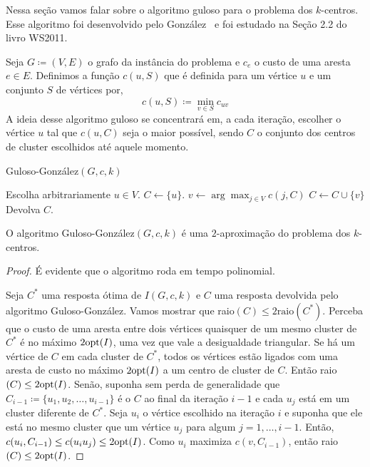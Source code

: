 Nessa seção vamos falar sobre o algoritmo guloso para o problema dos $k$-centros. Esse algoritmo foi desenvolvido pelo González~\cite{GONZALEZ1985293} e foi estudado na Seção 2.2 do livro WS2011.

Seja $G \coloneqq (V,E)$ o grafo da instância do problema e $c_e$ o custo de uma aresta $e \in E$.
Definimos a função $c(u,S)$ que é definida para um vértice $u$ e um conjunto $S$ de vértices  por,
\[ c(u,S) \coloneqq \min_{v\in S} c_{uv}
    \]
A ideia desse algoritmo guloso se concentrará em, a cada iteração, escolher o vértice $u$ tal que $c(u,C)$ seja o maior possível, sendo $C$ o conjunto dos centros de cluster escolhidos até aquele momento.

\begin{algorithm}
\caption{\sc Guloso-González$(G,c,k)$}
    \label{k-center:guloso}
    \begin{algorithmic}[1]
  \State Escolha arbitrariamente $u \in V$.
        \State $C \gets \{u\}$.
        \State $v \gets \arg\max_{j \in V} c(j,C)$
        \State $C \gets C \cup \{v\}$
        \EndWhile
  \State Devolva $C$.
\end{algorithmic}
\end{algorithm}

\begin{theorem}
    O algoritmo {\sc Guloso-González}$(G,c,k)$ é uma $2$-aproximação do problema dos $k$-centros.
\end{theorem}
\begin{proof}
    É evidente que o algoritmo roda em tempo polinomial. 
  
    Seja $C^*$ uma resposta ótima de $I(G,c,k)$ e $C$ uma resposta devolvida pelo algoritmo {\sc Guloso-González}. Vamos mostrar que raio$(C) \leq 2\text{raio}(C^*) $. Perceba que o custo de uma aresta entre dois vértices quaisquer de um mesmo cluster de $C^*$ é no máximo $2\mathrm{opt}(I)$, uma vez que vale a desigualdade triangular.
    Se há um vértice de $C$ em cada cluster de $C^*$, todos os vértices estão ligados com uma aresta de custo no máximo $2\mathrm{opt}(I)$ a um centro de cluster de $C$. Então raio$(C) \leq 2\mathrm{opt}(I)$. Senão, suponha sem perda de generalidade que $C_{i-1} \coloneqq \{ u_1,u_2,\ldots,u_{i-1}\}$ é o $C$ ao final da iteração $i-1$ e cada $u_j$ está em um cluster diferente de $C^*$. Seja $u_i$ o vértice escolhido na iteração $i$ e suponha que ele está no mesmo cluster que um vértice $u_j$ para algum $j=1,\ldots,i-1$. Então, $c(u_i,C_{i-1}) \leq c(u_iu_j) \leq 2\mathrm{opt}(I)$. Como $u_i$ maximiza $c(v,C_{i-1})$, então raio$(C) \leq 2\mathrm{opt}(I)$.
\end{proof}

